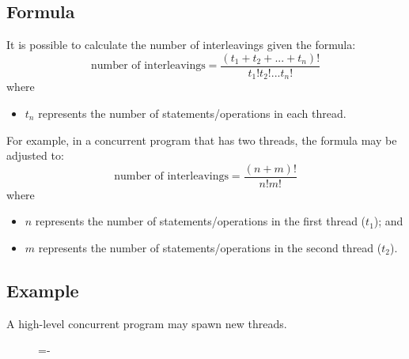 \documentclass[a4paper]{systems-software}
\begin{document}
\subsection*{Formula}

It is possible to calculate the number of interleavings given the formula:
\begin{equation*}
	\text{number of interleavings} = \frac{(t_{1} + t_{2} + ... + t_{n})!}{t_{1}!t_{2}!...t_{n}!}
\end{equation*}
where
\begin{itemize}
	\item $t_{n}$ represents the number of statements/operations in each thread.
\end{itemize}

For example, in a concurrent program that has two threads, the formula may be adjusted to:
\begin{equation*}
	\text{number of interleavings} = \frac{(n + m)!}{n!m!}
\end{equation*}
where
\begin{itemize}
	\item $n$ represents the number of statements/operations in the first thread ($t_{1}$); and
	\item $m$ represents the number of statements/operations in the second thread ($t_{2}$).
\end{itemize}


\subsection*{Example}

A high-level concurrent program may spawn new threads.

\begin{figure}[H]
  \lineskip=-\fboxrule
\end{figure}
\end{document}
